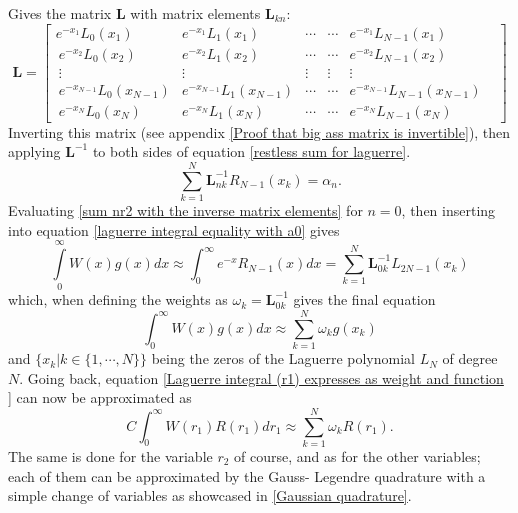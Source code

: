 \documentclass[10pt,a4paper]{article}
\begin{document}
Gives the matrix $\textbf{L}$ with matrix elements $\textbf{L}_{kn}$:
\begin{equation}\label{Big ass matrix}
\textbf{L}=
\begin{bmatrix}
e^{-x_{1}}L_{0}(x_{1}) & e^{-x_{1}} L_{1}( x_{1}) & \cdots &\cdots & e^{-x_{1}} L_{N-1} (x_{1})\\\ e^{-x_{2}} L_{0}( x_{2}) & e^{-x_{2}} L_{1}( x_{2}) & \cdots & \cdots &e^{-x_{2}} L_{N-1}( x_{2})\\\ \vdots & \vdots & \vdots & \vdots & \vdots & \\\ e^{-x_{N-1}} L_{0}( x_{N-1}) & e^{-x_{N-1}} L_{1}( x_{N-1}) & \cdots & \cdots & e^{-x_{N-1}} L_{N-1}( x_{N-1})\\\ e^{-x_{N}} L_{0}( x_{N}) & e^{-x_{N}} L_{1}( x_{N}) & \cdots & \cdots & e^{-x_{N}} L_{N-1}( x_{N})
\end{bmatrix}
\end{equation}
Inverting this matrix (see appendix \ref{Proof that big ass matrix is invertible}), then applying $\textbf{L}^{-1}$ to both sides of equation \ref{restless sum for laguerre}.
\begin{equation}\label{sum nr2 with the inverse matrix elements}
\sum\limits_{k=1}^{N}\textbf{L}_{nk}^{-1}R_{N-1}(x_k) = \alpha_n.
\end{equation}
Evaluating \ref{sum nr2 with the inverse matrix elements} for $n=0$, then inserting into equation \ref{laguerre integral equality with a0} gives
\begin{equation}
\int\limits_0^\infty W(x)g(x)dx \approx \int_{0}^{\infty}e^{-x} R_{N-1}(x)dx = \sum\limits_{k=1}^{N}\textbf{L}_{0k}^{-1} L_{2N-1}(x_k)
\end{equation}
which, when defining the weights as $\omega_k = \textbf{L}_{0k}^{-1}$ gives the final equation
\begin{equation}
\int_{0}^{\infty}W(x)g(x)dx \approx \sum\limits_{k=1}^N \omega_k g(x_k)
\end{equation}
and $\{x_k | k \in \{1,\cdots,N \}\}$ being the zeros of the Laguerre polynomial $L_N$ of degree $N$.
Going back, equation \ref{Laguerre integral (r1) expresses as weight and function } can now be approximated as
\begin{equation}
C\int_{0}^{\infty}W(r_1)R(r_1)dr_1 \approx \sum\limits_{k=1}^N \omega_k R(r_1).
\end{equation}
The same is done for the variable $r_2$ of course, and as for the other variables; each of them can be approximated by the Gauss- Legendre quadrature with a simple change of variables as showcased in \ref{Gaussian quadrature}.
\end{document}
